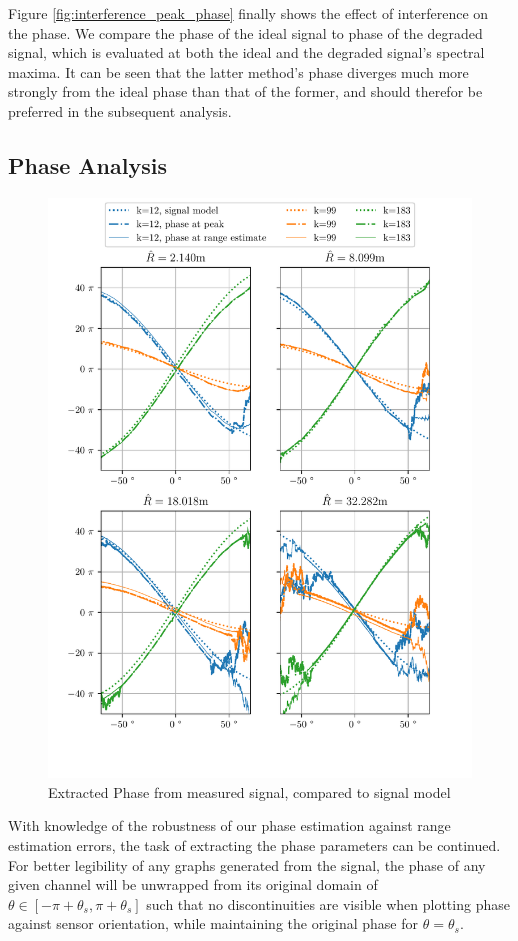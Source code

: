Figure \ref{fig:interference_peak_phase} finally shows the effect of interference on the phase.
We compare the phase of the ideal signal to phase of the degraded signal,
which is evaluated at both the ideal and the degraded signal's spectral maxima.
It can be seen that the latter method's phase diverges much more strongly from the ideal phase than that of the former,
and should therefor be preferred in the subsequent analysis. \\

\subsection{Phase Analysis}
\label{ssec:phase_analysis}
\begin{figure}
    \centering
    \includegraphics[width=\textwidth]{../figures/phase_estimates.pdf}
    \caption{Extracted Phase from measured signal, compared to signal model}
    \label{fig:measured_peak_phase}
\end{figure}
With knowledge of the robustness of our phase estimation against range estimation errors,
the task of extracting the phase parameters can be continued.
For better legibility of any graphs generated from the signal,
the phase of any given channel will be unwrapped from its original domain of $\theta \in [-\pi+\theta_s, \pi+\theta_s]$ such that no discontinuities
are visible when plotting phase against sensor orientation, while maintaining the original phase for $\theta = \theta_s$.


